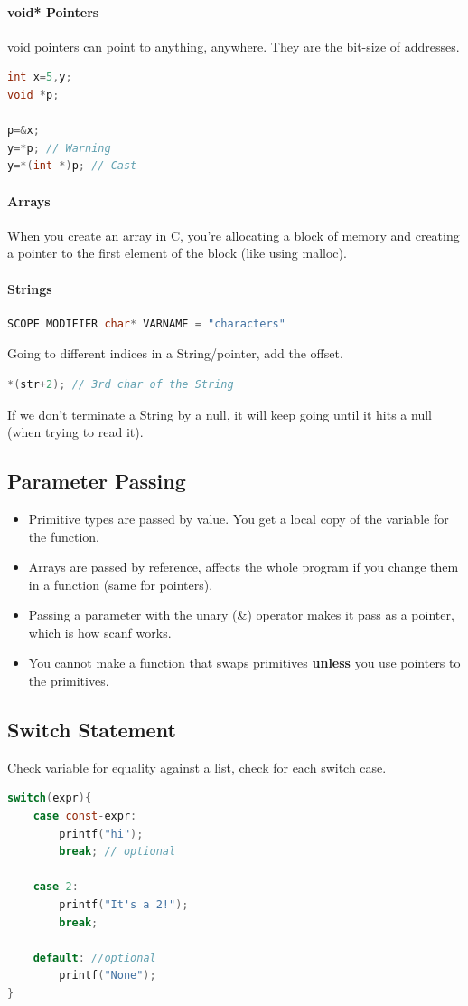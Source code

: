 \documentclass[12 pt]{article}
\begin{document}
\paragraph{void* Pointers} void pointers can point to anything, anywhere. They are the bit-size of addresses.
\begin{lstlisting}[language=c]
int x=5,y;
void *p;

p=&x;
y=*p; // Warning
y=*(int *)p; // Cast
\end{lstlisting}
\paragraph{Arrays} When you create an array in C, you're allocating a block of memory and creating a pointer to the first element of the block (like using malloc).
\paragraph{Strings}
\begin{lstlisting}[language=c]
SCOPE MODIFIER char* VARNAME = "characters"
\end{lstlisting}
Going to different indices in a String/pointer, add the offset.
\begin{lstlisting}[language=c]
*(str+2); // 3rd char of the String
\end{lstlisting}
If we don't terminate a String by a null, it will keep going until it hits a null
(when trying to read it).
\subsection{Parameter Passing}
\begin{itemize}
\item Primitive types are passed by value. You get a local copy of the variable for the function.
\item Arrays are passed by reference, affects the whole program if you change them in a function (same for pointers).
\item Passing a parameter with the unary (\&) operator makes it pass as a pointer, which is how scanf works.
\item You cannot make a function that swaps primitives \textbf{unless} you use pointers to the primitives.
\end{itemize}
\subsection{Switch Statement}
Check variable for equality against a list, check for each switch case.
\begin{lstlisting}[language=c]
switch(expr){
    case const-expr:
        printf("hi");
        break; // optional

    case 2:
        printf("It's a 2!");
        break;

    default: //optional
        printf("None");
}
\end{lstlisting}
\end{document}
